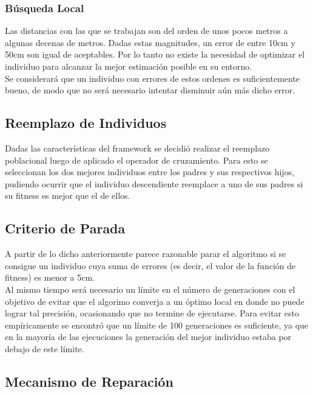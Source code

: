 \documentclass[journal]{IEEEtran}
\begin{document}
\subsubsection{Búsqueda Local}

Las distancias con las que se trabajan son del orden de unos pocos metros a algunas decenas de metros. Dadas estas magnitudes, un error de entre 10cm y 50cm son igual de aceptables. Por lo tanto no existe la necesidad de optimizar el individuo para alcanzar la mejor estimación posible en su entorno.\\

Se considerará que un individuo con errores de estos ordenes es suficientemente bueno, de modo que no será necesario intentar disminuir aún más dicho error.\\

\subsection{Reemplazo de Individuos}

Dadas las características del framework se decidió realizar el reemplazo poblacional luego de aplicado el operador de cruzamiento. Para esto se seleccionan los dos mejores individuos entre los padres y sus respectivos hijos, pudiendo ocurrir que el individuo descendiente reemplace a uno de sus padres si su fitness es mejor que el de ellos.\\

\subsection{Criterio de Parada}

A partir de lo dicho anteriormente parece razonable parar el algoritmo si se consigue un individuo cuya suma de errores (es decir, el valor de la función de fitness) es menor a 5cm.\\

Al mismo tiempo será necesario un límite en el número de generaciones con el objetivo de evitar que el algorimo converja a un óptimo local en donde no puede lograr tal precisión, ocasionando que no termine de ejecutarse. Para evitar esto empíricamente se encontró que un límite de 100 generaciones es suficiente, ya que en la mayoría de las ejecuciones la generación del mejor individuo estaba por debajo de este límite.\\

\subsection{Mecanismo de Reparación}
\end{document}
